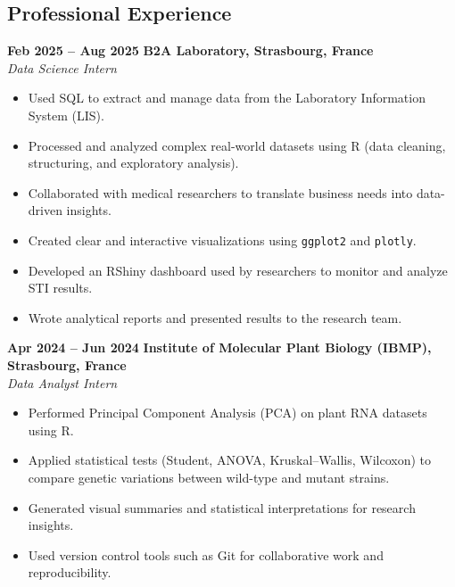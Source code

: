 \documentclass[lighthipster]{simplehipstercv}
\begin{document}
\begin{paracol}{2}
{\vspace{4em}


\phantom{turn the page}

\phantom{turn the page}
}
\switchcolumn

\small
\section*{Professional Experience}

\textbf{Feb 2025 -- Aug 2025} \hfill \textbf{B2A Laboratory, Strasbourg, France}\\
\textit{Data Science Intern}
\begin{itemize}[leftmargin=2em, itemsep=0.2em, topsep=0em]
    \item Used SQL to extract and manage data from the Laboratory Information System (LIS).
    \item Processed and analyzed complex real-world datasets using R (data cleaning, structuring, and exploratory analysis).
    \item Collaborated with medical researchers to translate business needs into data-driven insights.
    \item Created clear and interactive visualizations using \texttt{ggplot2} and \texttt{plotly}.
    \item Developed an RShiny dashboard used by researchers to monitor and analyze STI results.
    \item Wrote analytical reports and presented results to the research team.
\end{itemize}

\textbf{Apr 2024 -- Jun 2024} \hfill \textbf{Institute of Molecular Plant Biology (IBMP), Strasbourg, France}\\
\textit{Data Analyst Intern}
\begin{itemize}[leftmargin=2em, itemsep=0.2em, topsep=0em]
    \item Performed Principal Component Analysis (PCA) on plant RNA datasets using R.
    \item Applied statistical tests (Student, ANOVA, Kruskal–Wallis, Wilcoxon) to compare genetic variations between wild-type and mutant strains.
    \item Generated visual summaries and statistical interpretations for research insights.
    \item Used version control tools such as Git for collaborative work and reproducibility.
\end{itemize}


\end{paracol}
\end{document}
